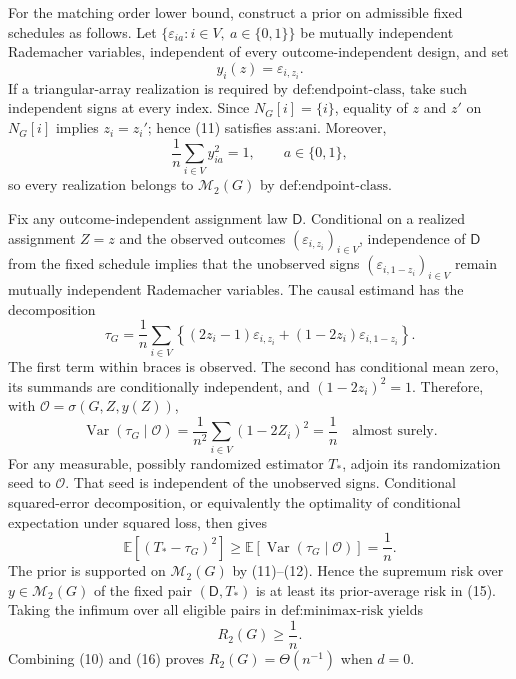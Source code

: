 For the matching order lower bound, construct a prior on admissible fixed schedules as follows.  Let \(\{\varepsilon_{ia}:i\in V,\ a\in\{0,1\}\}\) be mutually independent Rademacher variables, independent of every outcome-independent design, and set
\[
 y_i(z)=\varepsilon_{i,z_i}. \tag{11}
\]
If a triangular-array realization is required by \(\text{def:endpoint-class}\), take such independent signs at every index.  Since \(N_G[i]=\{i\}\), equality of \(z\) and \(z'\) on \(N_G[i]\) implies \(z_i=z_i'\); hence (11) satisfies \(\text{ass:ani}\).  Moreover,
\[
 \frac1n\sum_{i\in V}y_{ia}^2=1,
 \qquad a\in\{0,1\}, \tag{12}
\]
so every realization belongs to \(\mathcal M_2(G)\) by \(\text{def:endpoint-class}\).

Fix any outcome-independent assignment law \(\mathsf D\).  Conditional on a realized assignment \(Z=z\) and the observed outcomes \((\varepsilon_{i,z_i})_{i\in V}\), independence of \(\mathsf D\) from the fixed schedule implies that the unobserved signs \((\varepsilon_{i,1-z_i})_{i\in V}\) remain mutually independent Rademacher variables.  The causal estimand has the decomposition
\[
 \tau_G
 =\frac1n\sum_{i\in V}
   \left\{(2z_i-1)\varepsilon_{i,z_i}
   +(1-2z_i)\varepsilon_{i,1-z_i}\right\}. \tag{13}
\]
The first term within braces is observed.  The second has conditional mean zero, its summands are conditionally independent, and \((1-2z_i)^2=1\).  Therefore, with \(\mathscr O=\sigma(G,Z,y(Z))\),
\[
 \operatorname{Var}(\tau_G\mid\mathscr O)
 =\frac1{n^2}\sum_{i\in V}(1-2Z_i)^2
 =\frac1n
 \quad\text{almost surely}. \tag{14}
\]
For any measurable, possibly randomized estimator \(T_*\), adjoin its randomization seed to \(\mathscr O\).  That seed is independent of the unobserved signs.  Conditional squared-error decomposition, or equivalently the optimality of conditional expectation under squared loss, then gives
\[
 \mathbb E[(T_* -\tau_G)^2]
 \ge \mathbb E[\operatorname{Var}(\tau_G\mid\mathscr O)]
 =\frac1n. \tag{15}
\]
The prior is supported on \(\mathcal M_2(G)\) by (11)--(12).  Hence the supremum risk over \(y\in\mathcal M_2(G)\) of the fixed pair \((\mathsf D,T_*)\) is at least its prior-average risk in (15).  Taking the infimum over all eligible pairs in \(\text{def:minimax-risk}\) yields
\[
 R_2(G)\ge\frac1n. \tag{16}
\]
Combining (10) and (16) proves \(R_2(G)=\Theta(n^{-1})\) when \(d=0\).

